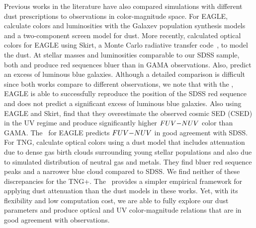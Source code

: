 Previous works in the literature have also compared simulations with different
dust prescriptions to observations in color-magnitude space. For EAGLE, 
\cite{trayford2015} calculate colors and luminosities with the {\sc Galaxev}
population synthesis models and a two-component screen model for dust. More
recently, \cite{trayford2017} calculated optical colors for EAGLE using {\sc
Skirt}, a Monte Carlo radiative transfer code~\citep{camps2015}, to model the
dust. At stellar masses and luminosities comparable to our SDSS sample, both 
\cite{trayford2015} and \cite{trayford2017} produce red sequences bluer than 
in GAMA observations. Also, \cite{trayford2015} predict an excess of luminous 
blue galaxies. Although a detailed comparison is difficult since both works 
compare to different observations, we note that with the \eda, EAGLE is able 
to successfully reproduce the position of the SDSS red sequence and does not 
predict a significant excess of luminous blue galaxies. Also using EAGLE and 
{\sc Skirt}, \cite{baes2019} find that they overestimate the observed cosmic 
SED (CSED) in the UV regime and produce significantly higher $FUV{-}NUV$ color 
than GAMA. The \eda~for EAGLE predicts $FUV{-}NUV$ in good agreement with SDSS. 
For TNG, \cite{nelson2018} calculate optical colors using a dust model that
includes attenuation due to dense gas birth clouds surrounding young stellar
populations and also due to simulated distribution of neutral gas and metals.
They find bluer red sequence peaks and a narrower blue cloud compared to SDSS.
We find neither of these discrepancies for the TNG+\eda. The \eda~provides a
simpler empirical framework for applying dust attenuation than the dust models
in these works. 
Yet, with its flexibility and low computation cost, we are able to fully
explore our dust parameters and produce optical and UV color-magnitude
relations that are in good agreement with observations.

 

 







